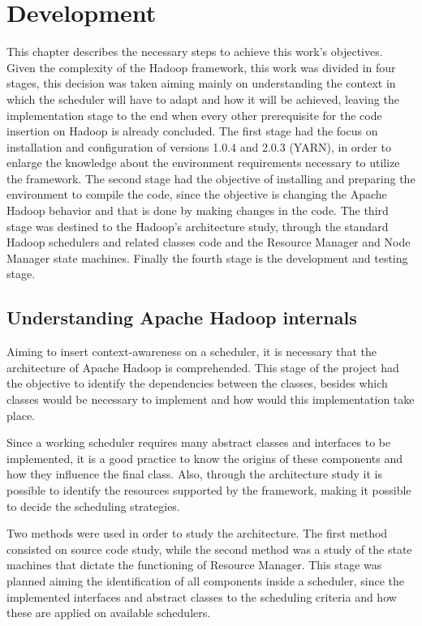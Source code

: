 \chapter{Development}
This chapter describes the necessary steps to achieve this work's objectives. Given the complexity of the Hadoop framework, this work was divided in four stages, this decision was taken aiming mainly on understanding the context in which the scheduler will have to adapt and how it will be achieved, leaving the implementation stage to the end when every other prerequisite for the code insertion on Hadoop is already concluded. The first stage had the focus on installation and configuration of versions 1.0.4 and 2.0.3 (YARN), in order to enlarge the knowledge about the environment requirements necessary to utilize the framework. The second stage had the objective of installing and preparing the environment to compile the code, since the objective is changing the Apache Hadoop behavior and that is done by making changes in the code. The third stage was destined to the Hadoop's architecture study, through the standard Hadoop schedulers and related classes code and the Resource Manager and Node Manager state machines. Finally the fourth stage is the development and testing stage.


\section{Understanding Apache Hadoop internals}
\label{sec:grafo}
Aiming to insert context-awareness on a scheduler, it is necessary that the architecture of Apache Hadoop is comprehended. This stage of the project had the objective to identify the dependencies between the classes, besides which classes would be necessary to implement and how would this implementation take place.

Since a working scheduler requires many abstract classes and interfaces to be implemented, it is a good practice to know the origins of these components and how they influence the final class. Also, through the architecture study  it is possible to identify the resources supported by the framework, making it possible to decide the scheduling strategies.

Two methods were used in order to study the architecture. The first method consisted on source code study, while the second method was a study of the state machines that dictate the functioning of Resource Manager. This stage was planned aiming  the identification of all components inside a scheduler, since the implemented interfaces and abstract classes to the scheduling criteria and how these are applied on available schedulers.

